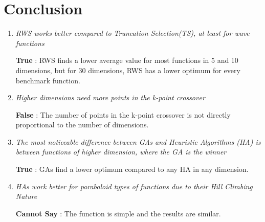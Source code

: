 \documentclass{article}
\begin{document}
\section{Conclusion}
\begin{enumerate}
    \item \textit{RWS works better compared to Truncation Selection(TS), at least for wave functions}
    
    \textbf{True} : RWS finds a lower average value for most functions in 5 and 10 dimensions, but for 30 dimensions, RWS has a lower optimum for every benchmark function.
    
    \item \textit{Higher dimensions need more points in the k-point crossover}
    
    \textbf{False} : The number of points in the k-point crossover is not directly proportional to the number of dimensions.

    \item \textit{The most noticeable difference between GAs and  Heuristic Algorithms (HA) is between functions of higher dimension, where the GA is the winner}
    
    \textbf{True} : GAs find a lower optimum compared to any HA in any dimension.
    
    \item \textit{HAs work better for paraboloid types of functions due to their Hill Climbing Nature}
    
    \textbf{Cannot Say} : The function is simple and the results are similar.
    
\end{enumerate}



\end{document}
